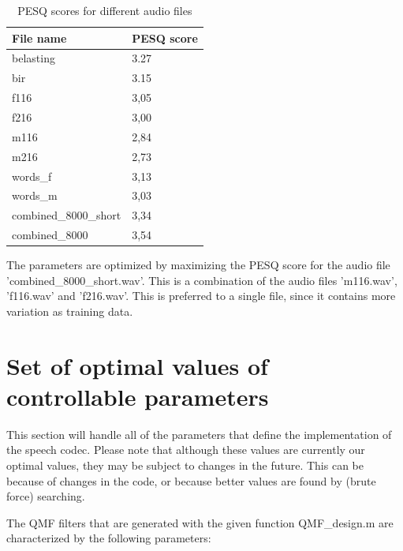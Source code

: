 \documentclass[a4paper]{article}
\begin{document}
\begin{table}[bth]
\begin{center}
\begin{tabular}{ l|l }
  File name & PESQ score \\
  \hline
  belasting & 3.27 \\
  bir & 3.15 \\
  f116 & 3,05 \\
  f216 & 3,00 \\
  m116 & 2,84 \\
  m216 & 2,73 \\
  words\_f & 3,13 \\
  words\_m & 3,03 \\
  combined\_8000\_short & 3,34 \\
  combined\_8000 & 3,54 \\
  \hline
\end{tabular}
  \caption{PESQ scores for different audio files}
\label{fig:pesqscores}
\end{center}
\end{table}

The parameters are optimized by maximizing the PESQ score for the audio file 'combined\_8000\_short.wav'. This is a combination of the audio files 'm116.wav', 'f116.wav' and 'f216.wav'. This is preferred to a single file, since it contains more variation as training data.

\section{Set of optimal values of controllable parameters}

This section will handle all of the parameters that define the implementation of the speech codec. Please note that although these values are currently our optimal values, they may be subject to changes in the future. This can be because of changes in the code, or because better values are found by (brute force) searching.

The QMF filters that are generated with the given function QMF\_design.m are characterized by the following parameters:
\end{document}
